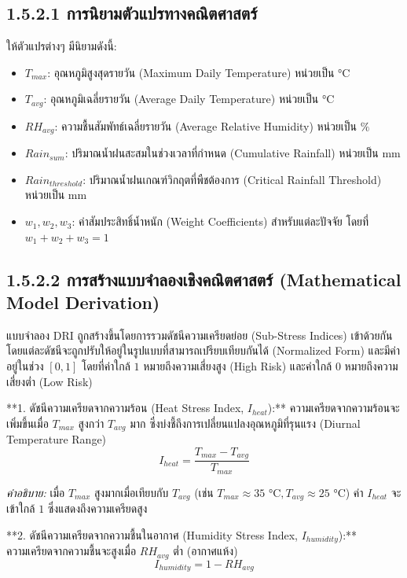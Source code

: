 \documentclass[11pt,a4paper,openany]{report}
\begin{document}
\subsection{1.5.2.1 การนิยามตัวแปรทางคณิตศาสตร์}


ให้ตัวแปรต่างๆ มีนิยามดังนี้:

\begin{itemize}
  \item $T_{max}$: อุณหภูมิสูงสุดรายวัน (Maximum Daily Temperature) หน่วยเป็น $\text{°C}$
  \item $T_{avg}$: อุณหภูมิเฉลี่ยรายวัน (Average Daily Temperature) หน่วยเป็น $\text{°C}$
  \item $RH_{avg}$: ความชื้นสัมพัทธ์เฉลี่ยรายวัน (Average Relative Humidity) หน่วยเป็น $\%$
  \item $Rain_{sum}$: ปริมาณน้ำฝนสะสมในช่วงเวลาที่กำหนด (Cumulative Rainfall) หน่วยเป็น $\text{mm}$
  \item $Rain_{threshold}$: ปริมาณน้ำฝนเกณฑ์วิกฤตที่พืชต้องการ (Critical Rainfall Threshold) หน่วยเป็น $\text{mm}$
  \item $w_1, w_2, w_3$: ค่าสัมประสิทธิ์น้ำหนัก (Weight Coefficients) สำหรับแต่ละปัจจัย โดยที่ $w_1 + w_2 + w_3 = 1$
\end{itemize}


\subsection{1.5.2.2 การสร้างแบบจำลองเชิงคณิตศาสตร์ (Mathematical Model Derivation)}


แบบจำลอง DRI ถูกสร้างขึ้นโดยการรวมดัชนีความเครียดย่อย (Sub-Stress Indices) เข้าด้วยกัน โดยแต่ละดัชนีจะถูกปรับให้อยู่ในรูปแบบที่สามารถเปรียบเทียบกันได้ (Normalized Form) และมีค่าอยู่ในช่วง $[0, 1]$ โดยที่ค่าใกล้ $1$ หมายถึงความเสี่ยงสูง (High Risk) และค่าใกล้ $0$ หมายถึงความเสี่ยงต่ำ (Low Risk)

**1. ดัชนีความเครียดจากความร้อน (Heat Stress Index, $I_{heat}$):**
ความเครียดจากความร้อนจะเพิ่มขึ้นเมื่อ $T_{max}$ สูงกว่า $T_{avg}$ มาก ซึ่งบ่งชี้ถึงการเปลี่ยนแปลงอุณหภูมิที่รุนแรง (Diurnal Temperature Range)
$$I_{heat} = \frac{T_{max} - T_{avg}}{T_{max}}$$

\textit{คำอธิบาย:} เมื่อ $T_{max}$ สูงมากเมื่อเทียบกับ $T_{avg}$ (เช่น $T_{max} \approx 35 \text{ °C}, T_{avg} \approx 25 \text{ °C}$) ค่า $I_{heat}$ จะเข้าใกล้ $1$ ซึ่งแสดงถึงความเครียดสูง

**2. ดัชนีความเครียดจากความชื้นในอากาศ (Humidity Stress Index, $I_{humidity}$):**
ความเครียดจากความชื้นจะสูงเมื่อ $RH_{avg}$ ต่ำ (อากาศแห้ง)
$$I_{humidity} = 1 - RH_{avg}$$
\end{document}

